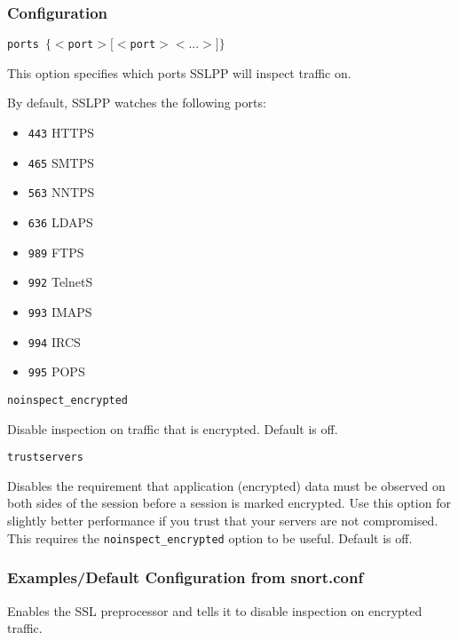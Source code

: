 \documentclass[english]{report}
\newcounter{slistnum}
\newenvironment{slist}
{ \begin{list}{ {\bf \arabic{slistnum}.} }{\usecounter{slistnum} } }
{ \end{list} }
\begin{document}
\subsubsection{Configuration}

\begin{slist}

\item \texttt{ports $\{ <$port$> [<$port$> <...>] \}$}

This option specifies which ports SSLPP will inspect traffic on.

By default, SSLPP watches the following ports:
    
\begin{itemize}
    \item \texttt{443}     HTTPS   
    \item \texttt{465}     SMTPS   
    \item \texttt{563}     NNTPS                                                                
    \item \texttt{636}     LDAPS
    \item \texttt{989}     FTPS
    \item \texttt{992}     TelnetS  
    \item \texttt{993}     IMAPS                 
    \item \texttt{994}     IRCS
    \item \texttt{995}     POPS
\end{itemize}

\item \texttt{noinspect\_encrypted}

Disable inspection on traffic that is encrypted.  Default is off.

\item \texttt{trustservers}

Disables the requirement that application (encrypted) data must be observed on
both sides of the session before a session is marked encrypted.  Use this
option for slightly better performance if you trust that your servers are not
compromised.  This requires the \texttt{noinspect\_encrypted} option to be
useful.  Default is off.  \end{slist}

\subsubsection{Examples/Default Configuration from snort.conf}

Enables the SSL preprocessor and tells it to disable inspection on encrypted
traffic.
\end{document}
